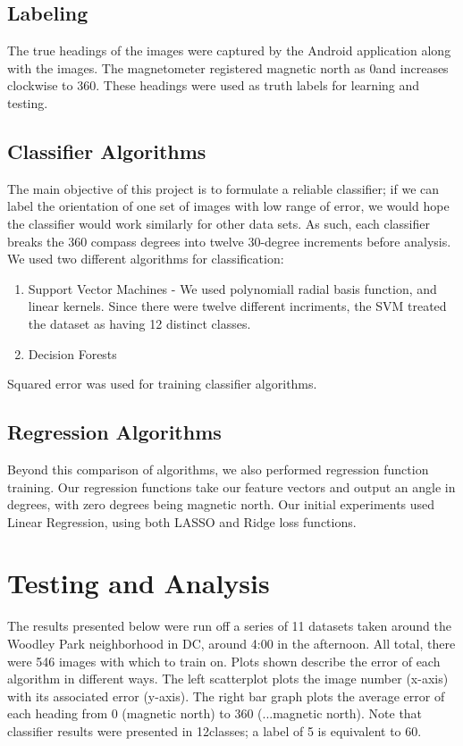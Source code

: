 \documentclass{article}
\begin{document}
\subsection{Labeling}
The true headings of the images were captured by the Android application along with the images. The magnetometer  registered magnetic north as 0\degrees and increases clockwise to 360\degrees. These headings were used as truth labels for learning and testing.

\subsection{Classifier Algorithms}
The main objective of this project is to formulate a reliable classifier; if we can label the orientation of one set of images with low range of error, we would hope the classifier would work similarly for other data sets. As such, each classifier breaks the 360 compass degrees into twelve 30-degree increments before analysis. We used two different algorithms for classification: 
\begin{enumerate}[1.]
\item Support Vector Machines - We used polynomiall radial basis function, and linear kernels. Since there were twelve different incriments, the SVM treated the dataset as having 12 distinct classes. 
\item Decision Forests
\end{enumerate}
Squared error was used for training classifier algorithms.

\subsection{Regression Algorithms}
Beyond this comparison of algorithms, we also performed regression function training. Our regression functions take our feature vectors and output an angle in degrees, with zero degrees being magnetic north. Our initial experiments used Linear Regression, using both LASSO and Ridge loss functions. 

\section{Testing and Analysis}

The results presented below were run off a series of 11 datasets taken around the Woodley Park neighborhood in DC, around 4:00 in the afternoon. All total, there were 546 images with which to train on. Plots shown describe the error of each algorithm in different ways. The left scatterplot plots the image number (x-axis) with its associated error (y-axis). The right bar graph plots the average error of each heading from 0 (magnetic north) to 360 (...magnetic north). Note that classifier results were presented in 12\degrees classes; a label of 5 is equivalent to 60\degrees. 
\end{document}
